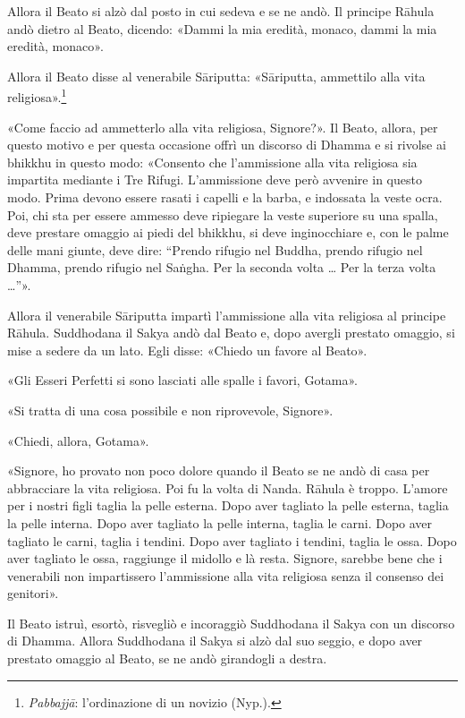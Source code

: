 Allora il Beato si alzò dal posto in cui sedeva e se ne andò. Il principe Rāhula
andò dietro al Beato, dicendo: «Dammi la mia eredità, monaco, dammi la mia
eredità, monaco».

Allora il Beato disse al venerabile Sāriputta: «Sāriputta, ammettilo alla vita
religiosa».\footnote{\emph{Pabbajjā}: l’ordinazione di un novizio (Nyp.).}

«Come faccio ad ammetterlo alla vita religiosa, Signore?». Il Beato, allora, per
questo motivo e per questa occasione offrì un discorso di Dhamma e si rivolse ai
bhikkhu in questo modo: «Consento che l’ammissione alla vita religiosa sia
impartita mediante i Tre Rifugi. L’ammissione deve però avvenire in questo modo.
Prima devono essere rasati i capelli e la barba, e indossata la veste ocra. Poi,
chi sta per essere ammesso deve ripiegare la veste superiore su una spalla, deve
prestare omaggio ai piedi del bhikkhu, si deve inginocchiare e, con le palme
delle mani giunte, deve dire: “Prendo rifugio nel Buddha, prendo rifugio nel
Dhamma, prendo rifugio nel Saṅgha. Per la seconda volta … Per la terza volta
…”».

Allora il venerabile Sāriputta impartì l’ammissione alla vita religiosa al
principe Rāhula. Suddhodana il Sakya andò dal Beato e, dopo avergli prestato
omaggio, si mise a sedere da un lato. Egli disse: «Chiedo un favore al Beato».

«Gli Esseri Perfetti si sono lasciati alle spalle i favori, Gotama».

«Si tratta di una cosa possibile e non riprovevole, Signore».

«Chiedi, allora, Gotama».

«Signore, ho provato non poco dolore quando il Beato se ne andò di casa per
abbracciare la vita religiosa. Poi fu la volta di Nanda. Rāhula è troppo.
L’amore per i nostri figli taglia la pelle esterna. Dopo aver tagliato la pelle
esterna, taglia la pelle interna. Dopo aver tagliato la pelle interna, taglia le
carni. Dopo aver tagliato le carni, taglia i tendini. Dopo aver tagliato i
tendini, taglia le ossa. Dopo aver tagliato le ossa, raggiunge il midollo e là
resta. Signore, sarebbe bene che i venerabili non impartissero l’ammissione alla
vita religiosa senza il consenso dei genitori».

Il Beato istruì, esortò, risvegliò e incoraggiò Suddhodana il Sakya con un
discorso di Dhamma. Allora Suddhodana il Sakya si alzò dal suo seggio, e dopo
aver prestato omaggio al Beato, se ne andò girandogli a destra.

